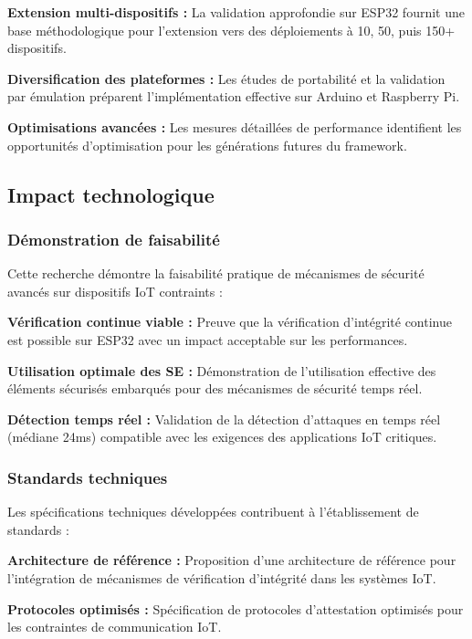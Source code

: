\textbf{Extension multi-dispositifs :} La validation approfondie sur ESP32 fournit une base méthodologique pour l'extension vers des déploiements à 10, 50, puis 150+ dispositifs.

\textbf{Diversification des plateformes :} Les études de portabilité et la validation par émulation préparent l'implémentation effective sur Arduino et Raspberry Pi.

\textbf{Optimisations avancées :} Les mesures détaillées de performance identifient les opportunités d'optimisation pour les générations futures du framework.

\subsection{Impact technologique}

\subsubsection{Démonstration de faisabilité}

Cette recherche démontre la faisabilité pratique de mécanismes de sécurité avancés sur dispositifs IoT contraints :

\textbf{Vérification continue viable :} Preuve que la vérification d'intégrité continue est possible sur ESP32 avec un impact acceptable sur les performances.

\textbf{Utilisation optimale des SE :} Démonstration de l'utilisation effective des éléments sécurisés embarqués pour des mécanismes de sécurité temps réel.

\textbf{Détection temps réel :} Validation de la détection d'attaques en temps réel (médiane 24ms) compatible avec les exigences des applications IoT critiques.

\subsubsection{Standards techniques}

Les spécifications techniques développées contribuent à l'établissement de standards :

\textbf{Architecture de référence :} Proposition d'une architecture de référence pour l'intégration de mécanismes de vérification d'intégrité dans les systèmes IoT.

\textbf{Protocoles optimisés :} Spécification de protocoles d'attestation optimisés pour les contraintes de communication IoT.

